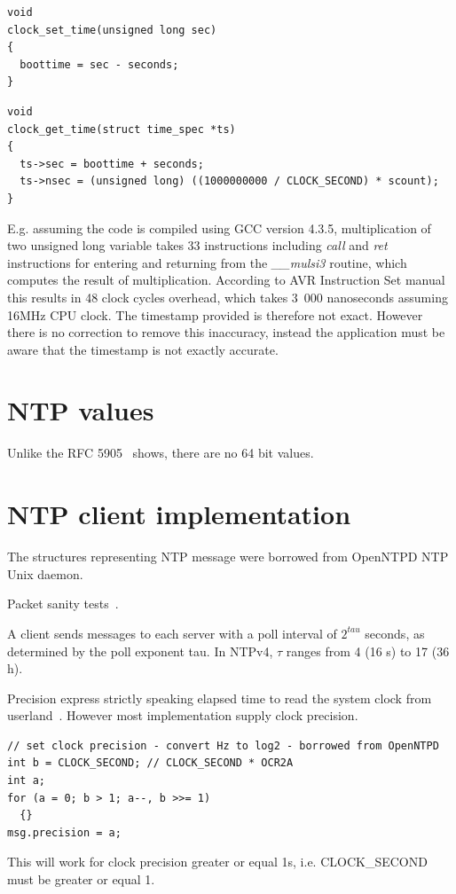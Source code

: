 \begin{lstlisting}
void
clock_set_time(unsigned long sec)
{
  boottime = sec - seconds;
}
\end{lstlisting}

\begin{lstlisting}
void
clock_get_time(struct time_spec *ts)
{
  ts->sec = boottime + seconds;
  ts->nsec = (unsigned long) ((1000000000 / CLOCK_SECOND) * scount);
}
\end{lstlisting}
E.g. assuming the code is compiled using GCC version 4.3.5,
multiplication of two unsigned long variable takes 33 instructions including {\it{call}} and {\it{ret}}
instructions for entering and returning from the {\it{\_\_mulsi3}} routine, which computes
the result of multiplication.
According to AVR Instruction Set manual~\cite{avr-instruction-set} this results in 48 clock cycles overhead,
which takes 3~000 nanoseconds assuming 16MHz CPU clock.
The timestamp provided is therefore not exact.
However there is no correction to remove this inaccuracy,
instead the application must be aware that the timestamp is not exactly accurate.


\section{NTP values}
Unlike the RFC 5905~\cite{rfc5905} shows, there are no 64 bit values. %


\section{NTP client implementation}
The structures representing NTP message were borrowed from OpenNTPD NTP Unix daemon.

Packet sanity tests~\cite{ntp-arch}.

A client sends messages to each server with a poll interval of $2^{tau}$
seconds, as determined by the poll exponent tau.
In NTPv4, $\tau$ ranges from 4 (16 s) to 17 (36 h).


Precision express strictly speaking elapsed time to read the system clock from userland~\cite{ntp-arch}.
However most implementation supply clock precision.
\begin{lstlisting}
// set clock precision - convert Hz to log2 - borrowed from OpenNTPD
int b = CLOCK_SECOND; // CLOCK_SECOND * OCR2A
int a;
for (a = 0; b > 1; a--, b >>= 1)
  {}
msg.precision = a;
\end{lstlisting}
This will work for clock precision greater or equal 1s, i.e. CLOCK\_SECOND must be greater or equal 1.

